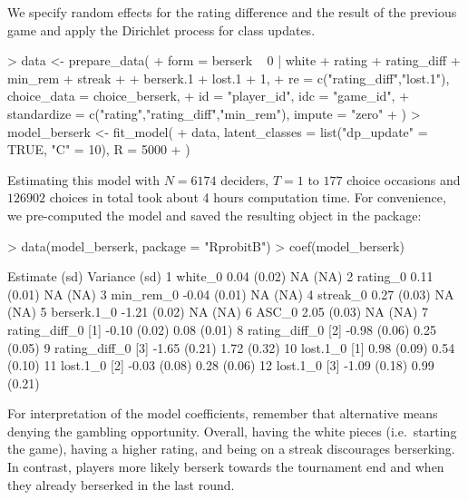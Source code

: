 \documentclass[article,shortnames]{jss}
\begin{document}
We specify random effects for the rating difference and the result of the previous game and apply the Dirichlet process for class updates.

\begin{Schunk}
\begin{Sinput}
> data <- prepare_data(
+    form = berserk ~ 0 | white + rating + rating_diff + min_rem + streak +
+      berserk.1 + lost.1 + 1,
+    re = c("rating_diff","lost.1"), choice_data = choice_berserk,
+    id = "player_id", idc = "game_id",
+    standardize = c("rating","rating_diff","min_rem"), impute = "zero"
+  )
> model_berserk <- fit_model(
+    data, latent_classes = list("dp_update" = TRUE, "C" = 10), R = 5000
+  )
\end{Sinput}
\end{Schunk}

Estimating this model with $N = 6174$ deciders, $T = 1$ to $177$ choice occasions and $126902$ choices in total took about 4 hours computation time. For convenience, we pre-computed the model and saved the resulting  object in the package:

\begin{Schunk}
\begin{Sinput}
> data(model_berserk, package = "RprobitB")
> coef(model_berserk)
\end{Sinput}
\begin{Soutput}
                     Estimate   (sd) Variance   (sd)
1           white_0      0.04 (0.02)       NA   (NA)
2          rating_0      0.11 (0.01)       NA   (NA)
3         min_rem_0     -0.04 (0.01)       NA   (NA)
4          streak_0      0.27 (0.03)       NA   (NA)
5       berserk.1_0     -1.21 (0.02)       NA   (NA)
6             ASC_0      2.05 (0.03)       NA   (NA)
7  rating_diff_0 [1]    -0.10 (0.02)     0.08 (0.01)
8  rating_diff_0 [2]    -0.98 (0.06)     0.25 (0.05)
9  rating_diff_0 [3]    -1.65 (0.21)     1.72 (0.32)
10      lost.1_0 [1]     0.98 (0.09)     0.54 (0.10)
11      lost.1_0 [2]    -0.03 (0.08)     0.28 (0.06)
12      lost.1_0 [3]    -1.09 (0.18)     0.99 (0.21)
\end{Soutput}
\end{Schunk}

For interpretation of the model coefficients, remember that alternative  means denying the gambling opportunity. Overall, having the white pieces (i.e.\ starting the game), having a higher rating, and being on a streak discourages berserking. In contrast, players more likely berserk towards the tournament end and when they already berserked in the last round.
\end{document}
